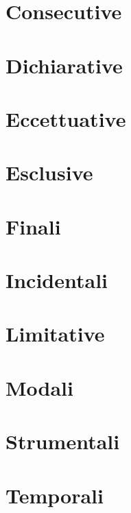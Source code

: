 \documentclass[
  a4paper,
  twoside,
  11pt,
  chapterprefix=false,
  bibliography=totocnumbered,
  listof=flat]{scrbook}
\begin{document}
\hypertarget{consecutive}{%
\section{Consecutive}\label{consecutive}}

\hypertarget{dichiarative}{%
\section{Dichiarative}\label{dichiarative}}

\hypertarget{eccettuative}{%
\section{Eccettuative}\label{eccettuative}}

\hypertarget{esclusive}{%
\section{Esclusive}\label{esclusive}}

\hypertarget{finali}{%
\section{Finali}\label{finali}}

\hypertarget{incidentali}{%
\section{Incidentali}\label{incidentali}}

\hypertarget{limitative}{%
\section{Limitative}\label{limitative}}

\hypertarget{modali}{%
\section{Modali}\label{modali}}

\hypertarget{strumentali}{%
\section{Strumentali}\label{strumentali}}

\hypertarget{temporali}{%
\section{Temporali}\label{temporali}}
\end{document}
